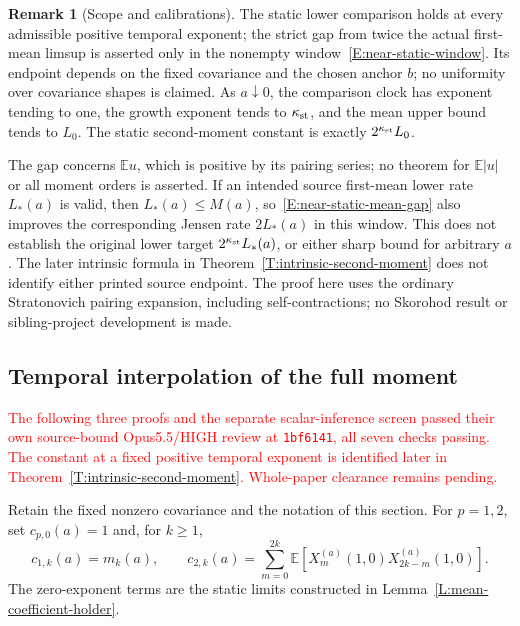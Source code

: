 \documentclass[12pt]{article}
\numberwithin{equation}{section}
\theoremstyle{definition}
\newtheorem{remark}[theorem]{Remark}
\newcommand{\E}{\mathbb{E}}
\newcommand{\myCmts}[1]{\begin{framed}\noindent\textcolor{red}{#1}\end{framed}}
\begin{document}
\begin{remark}[Scope and calibrations]\label{R:near-static-scope}
  The static lower comparison holds at every admissible positive temporal
  exponent; the strict gap from twice the actual first-mean limsup is
  asserted only in the nonempty window~\eqref{E:near-static-window}.
  Its endpoint depends on the fixed covariance and the chosen anchor $b$;
  no uniformity over covariance shapes is claimed. As $a\downarrow0$,
  the comparison clock has exponent tending to one, the growth exponent
  tends to $\kappa_{\rm st}$, and the mean upper bound tends to $L_0$.
  The static second-moment constant is exactly $2^{\kappa_{\rm st}}L_0$.

  The gap concerns $\E u$, which is positive by its pairing series;
  no theorem for $\E|u|$ or all moment orders is asserted.
  If an intended source first-mean lower rate $L_*(a)$ is valid, then
  $L_*(a)\le M(a)$, so~\eqref{E:near-static-mean-gap} also improves
  the corresponding Jensen rate $2L_*(a)$ in this window.
  This does not establish the original lower target
  $2^{\kappa_{\rm st}}L_*(a)$, or either sharp bound for arbitrary $a$.
  The later intrinsic formula in Theorem~\ref{T:intrinsic-second-moment}
  does not identify either printed source endpoint. The proof here uses the ordinary
  Stratonovich pairing expansion, including self-contractions; no
  Skorohod result or sibling-project development is made.
\end{remark}


\subsection{Temporal interpolation of the full moment}
\label{S:temporal-type-continuity}

\myCmts{The following three proofs and the separate scalar-inference screen
passed their own source-bound Opus5.5/HIGH review at \texttt{1bf6141},
all seven checks passing. The constant at a fixed positive temporal
exponent is identified later in Theorem~\ref{T:intrinsic-second-moment}.
Whole-paper clearance remains pending.}

Retain the fixed nonzero covariance and the notation of this section.
For \(p=1,2\), set \(c_{p,0}(a)=1\) and, for \(k\ge1\),
\begin{equation}\label{E:full-moment-coefficients}
  c_{1,k}(a)=m_k(a),\qquad
  c_{2,k}(a)=\sum_{m=0}^{2k}
  \E[X_m^{(a)}(1,0)X_{2k-m}^{(a)}(1,0)].
\end{equation}
The zero-exponent terms are the static limits constructed in
Lemma~\ref{L:mean-coefficient-holder}.
\end{document}
